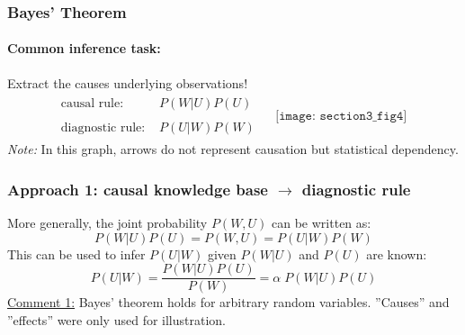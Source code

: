 \subsubsection{Bayes' Theorem}
\paragraph{Common inference task:} Extract the causes underlying observations!
\[ \begin{array}{ll}
	\begin{array}{ll}
	\text{causal rule: } & P(W|U)P(U) \\\\
	\text{diagnostic rule: } & P(U|W)P(W) 
	\end{array}
	& \begin{array}{l}
	\texttt{[image: section3\_fig4]}
	\end{array}
\end{array} \]
\emph{Note:} In this graph, arrows do not represent causation but statistical dependency. 

\subsubsection*{Approach 1: causal knowledge base $\rightarrow$ diagnostic rule}
More generally, the joint probability $P(W,U)$ can be written as:
\begin{equation}\tag{Product rule}
	P(W|U)P(U) = P(W,U) = P(U|W)P(W)
\end{equation}
This can be used to infer $P(U|W)$ given $P(W|U)$ and $P(U)$ are known:
\begin{equation}\tag{Bayes' Theorem}
	P(U|W) = \frac{P(W|U)P(U)}{P(W)} = \alpha \; P(W|U)P(U)
\end{equation}
\underline{Comment 1:} Bayes' theorem holds for arbitrary random variables. ''Causes'' and ''effects'' were only used for illustration.

